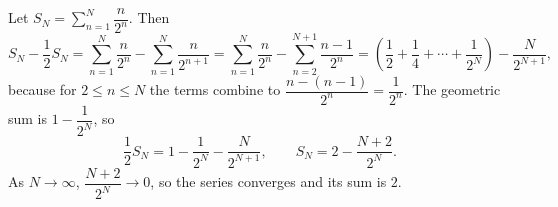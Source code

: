 Let $S_N=\displaystyle\sum_{n=1}^{N}\dfrac{n}{2^n}$. Then
\[S_N-\dfrac{1}{2}S_N=\sum_{n=1}^{N}\dfrac{n}{2^n}-\sum_{n=1}^{N}\dfrac{n}{2^{n+1}}=\sum_{n=1}^{N}\dfrac{n}{2^n}-\sum_{n=2}^{N+1}\dfrac{n-1}{2^{n}}=\left(\dfrac{1}{2}+\dfrac{1}{4}+\cdots+\dfrac{1}{2^N}\right)-\dfrac{N}{2^{N+1}},\]
because for $2\le n\le N$ the terms combine to $\dfrac{n-(n-1)}{2^n}=\dfrac{1}{2^n}$. The geometric sum is $1-\dfrac{1}{2^N}$, so
\[\dfrac{1}{2}S_N=1-\dfrac{1}{2^N}-\dfrac{N}{2^{N+1}},\qquad S_N=2-\dfrac{N+2}{2^N}.\]
As $N\to\infty$, $\dfrac{N+2}{2^N}\to0$, so the series converges and its sum is $\boxed{2}$.
